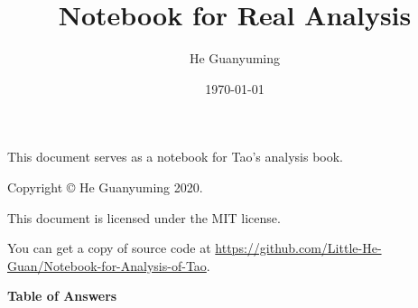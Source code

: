 \documentclass[11pt]{article}
\author{He Guanyuming}
\title{Notebook for Real Analysis}
\date{\today}
\begin{document}
\maketitle

\begin{center}
This document serves as a notebook for Tao's analysis book.
\end{center}

\vspace{\fill}

\begin{center}
Copyright \copyright{} He Guanyuming 2020. 

This document is licensed under the MIT license.

You can get a copy of source code at 
\url{https://github.com/Little-He-Guan/Notebook-for-Analysis-of-Tao}.
\end{center}

\newpage
{}
\tableofcontents

\newpage
{}
\pagestyle{headings}



\newpage


\newpage


\newpage
\begin{center}
\begin{Large}
\textbf{Table of Answers}
\end{Large}
\end{center}
\end{document}
